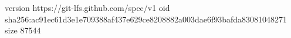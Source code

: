version https://git-lfs.github.com/spec/v1
oid sha256:ac91ec61d3e1e709388af437e629ce8208882a003dae6f93bafda83081048271
size 87544
